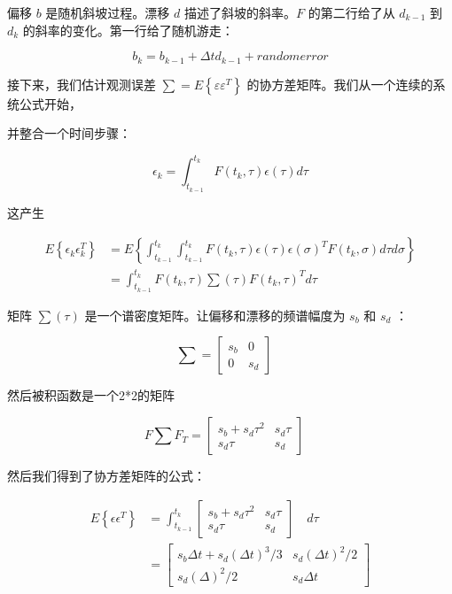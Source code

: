 		 
		 偏移 $ b $ 是随机斜坡过程。漂移 $ d  $ 描述了斜坡的斜率。$ F $ 的第二行给了从 $ d_{k-1} $ 到 $ d_{k} $ 的斜率的变化。第一行给了随机游走：
		 
		 \[ b_{k}=b_{k-1}+\Delta t d_{k-1}+random error \]
		 
		 
		 接下来，我们估计观测误差 $ \sum = E\left\lbrace \varepsilon \varepsilon^{T} \right\rbrace  $  的协方差矩阵。我们从一个连续的系统公式开始，
		 
		 并整合一个时间步骤：
		 
		  \[ \epsilon_{k}=\int_{t_{k-1}}^{t_{k}}F(t_{k},\tau)\epsilon(\tau)d\tau \]	
		  
		  这产生
		  
		 	\begin{equation*}
		 \begin{aligned}
		 E\left\lbrace \epsilon_{k} \epsilon_{k}^{T} \right\rbrace &=E\left\lbrace\int_{t_{k-1}}^{t_{k}}\int_{t_{k-1}}^{t_{k}} F(t_{k},\tau)\epsilon(\tau)\epsilon(\sigma)^{T}F(t_{k},\sigma)d\tau d\sigma \right\rbrace \\
		 &= \int_{t_{k-1}}^{t_{k}} F(t_{k},\tau)\sum(\tau)F(t_{k},\tau)^{T}d\tau
		 \end{aligned}
		 \end{equation*}
		 
		  矩阵 $\sum (\tau)$ 是一个谱密度矩阵。让偏移和漂移的频谱幅度为  $ s_{b} $ 和 $ s_{d}$ ：
		  
		  	\[ \sum = \begin{bmatrix} s_{b}&0  \\ 0&s_{d} \end{bmatrix} \quad \]
		  	
		  然后被积函数是一个2*2的矩阵
		  
		  \[ F\sum F_{T} = \begin{bmatrix} s_{b}+s_{d} \tau ^{2} & s_{d}\tau \\s_{d}\tau & s_{d} \end{bmatrix} \quad  \]
		  
		  然后我们得到了协方差矩阵的公式：
		  
		  	\begin{equation}\label{5.28}
		  \begin{aligned}
		  E\left\lbrace\epsilon \epsilon^{T} \right\rbrace &=\int_{t_{k-1}}^{t_{k}} \begin{bmatrix}
		  s_{b}+s_{d}\tau^{2}&s_{d}\tau\\s_{d}\tau&s_{d}
		  \end{bmatrix}\quad d\tau\\
		  &=\begin{bmatrix}
		  s_{b}\Delta t+s_{d}(\Delta t)^{3}/3&s_{d}(\Delta t)^{2}/2\\s_{d}(\Delta)^{2}/2&s_{d}\Delta t
		  \end{bmatrix}
		  \end{aligned}
		  \end{equation}
		  

